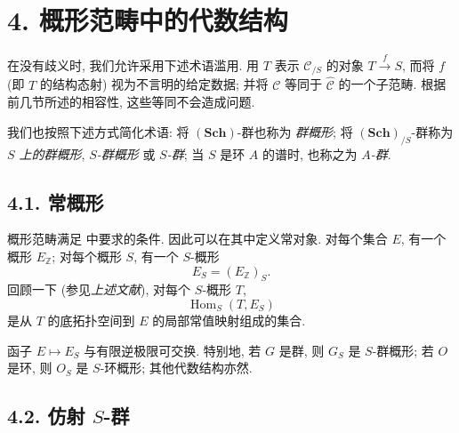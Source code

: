 
\section*{4. 概形范畴中的代数结构}

在没有歧义时, 我们允许采用下述术语滥用. 用 \(T\) 表示
\(\mathscr C_{/S}\) 的对象 \(T\xrightarrow{f}S\), 而将 \(f\)
(即 \(T\) 的结构态射) 视为不言明的给定数据; 并将
\(\mathscr C\) 等同于 \(\widehat{\mathscr C}\) 的一个子范畴.
根据前几节所述的相容性, 这些等同不会造成问题.

我们也按照下述方式简化术语: 将 \((\mathbf{Sch})\)-群也称为
\emph{群概形}; 将 \((\mathbf{Sch})_{/S}\)-群称为
\emph{\(S\) 上的群概形}, \emph{\(S\)-群概形} 或 \emph{\(S\)-群};
当 \(S\) 是环 \(A\) 的谱时, 也称之为 \emph{\(A\)-群}.

\subsection*{4.1. 常概形}

概形范畴满足  中要求的条件.
因此可以在其中定义常对象. 对每个集合 \(E\), 有一个概形
\(E_{\mathbb Z}\); 对每个概形 \(S\), 有一个 \(S\)-概形
\[
  E_S=(E_{\mathbb Z})_S.
\]
回顾一下 (参见\emph{上述文献}), 对每个 \(S\)-概形 \(T\),
\[
  \operatorname{Hom}_S(T,E_S)
\]
是从 \(T\) 的底拓扑空间到 \(E\) 的局部常值映射组成的集合.

函子 \(E\mapsto E_S\) 与有限逆极限可交换. 特别地, 若 \(G\) 是群,
则 \(G_S\) 是 \(S\)-群概形; 若 \(O\) 是环, 则 \(O_S\) 是
\(S\)-环概形; 其他代数结构亦然.

\subsection*{4.2. 仿射 \(S\)-群}

